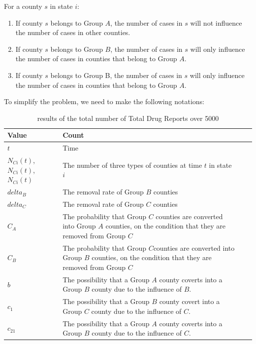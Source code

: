 \documentclass{mcmthesis}
\begin{document}
For a county $s$ in state $i$:
\begin{enumerate}
  \item If county $s$ belongs to Group $A$, the number of cases in $s$ will not influence the number of cases in other counties.
  \item If county $s$ belongs to Group $B$, the number of cases in $s$ will only influence the number of cases in counties that belong to Group $A$.
  \item If county $s$ belongs to Group B, the number of cases in $s$ will only influence the number of cases in counties that belong to Group $A$.
\end{enumerate}

To simplify the problem, we need to make the following notations:
\begin{table}[H]
  \centering
  \caption{results of the total number of Total Drug Reports over 5000}
    \begin{tabular}{lp{12cm}p{12cm}p{12cm}}
    \toprule
    Value & Count \\
    \midrule
 $t$&Time\\
 
${N_{Ci}}(t)$, ${N_{Ci}}(t)$, ${N_{Ci}}(t)$ &The number of three types of counties at time $t$ in state $i$\\

${delta _B}$& The removal rate of Group $B$ counties\\

${delta _C}$& The removal rate of Group $C$ counties\\

${C_A}$& The probability that Group $C$ counties are converted into Group $A$ counties, on the condition that they are removed from Group $C$\\

${C_B}$&The probability that Group $C $counties are converted into Group $B$ counties, on the condition that they are removed from Group $C$\\

$ {b}$&The possibility that a Group $A$ county coverts into a Group $B$ county due to the influence of $B$.\\

$ {c_1}$&The possibility that a Group $B$ county covert into a Group $C$ county due to the influence of $C$.\\

$ {c_21}$&The possibility that a Group $A$ county coverts into a Group $B$ county due to the influence of $C$.\\


\end{tabular}
\end{table}
\end{document}
